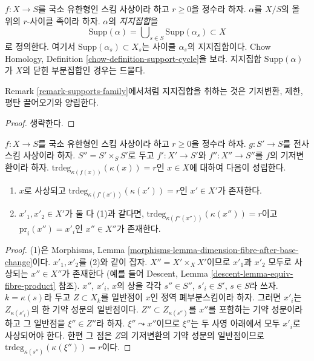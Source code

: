 \begin{remark}[지지집합]
\label{remark-supports-family}
$f : X \to S$를 국소 유한형인 스킴 사상이라 하고 $r \geq 0$을
정수라 하자. $\alpha$를 $X/S$의 올 위의 $r$-사이클 족이라 하자.
$\alpha$의 {\it 지지집합}을
$$
\text{Supp}(\alpha) =
\bigcup\nolimits_{s \in S} \text{Supp}(\alpha_s) \subset X
$$
로 정의한다. 여기서 $\text{Supp}(\alpha_s) \subset X_s$는
사이클 $\alpha_s$의 지지집합이다. Chow Homology, Definition
\ref{chow-definition-support-cycle}을 보라. 지지집합
$\text{Supp}(\alpha)$가 $X$의 닫힌 부분집합인 경우는 드물다.
\end{remark}

\begin{lemma}
\label{lemma-support-family}
Remark \ref{remark-supports-family}에서처럼 지지집합을 취하는 것은
기저변환, 제한, 평탄 끌어오기와 양립한다.
\end{lemma}

\begin{proof}
생략한다.
\end{proof}



\begin{lemma}
\label{lemma-coequalizer-dim-r}
$f : X \to S$를 국소 유한형인 스킴 사상이라 하고 $r \geq 0$을
정수라 하자. $g : S' \to S$를 전사 스킴 사상이라 하자.
$S'' = S' \times_S S'$로 두고 $f' : X' \to S'$와
$f'' : X'' \to S''$를 $f$의 기저변환이라 하자.
$\text{trdeg}_{\kappa(f(x))}(\kappa(x)) = r$인 $x \in X$에 대하여
다음이 성립한다.
\begin{enumerate}
\item $x$로 사상되고 $\text{trdeg}_{\kappa(f'(x'))}(\kappa(x')) = r$인
$x' \in X'$가 존재한다.
\item $x'_1, x'_2 \in X'$가 둘 다 (1)과 같다면,
$\text{trdeg}_{\kappa(f''(x''))}(\kappa(x'')) = r$이고
$\text{pr}_i(x'') = x'_i$인 $x'' \in X''$가 존재한다.
\end{enumerate}
\end{lemma}

\begin{proof}
(1)은 Morphisms, Lemma
\ref{morphisms-lemma-dimension-fibre-after-base-change}이다.
$x'_1, x'_2$를 (2)와 같이 잡자. $X'' = X' \times_X X'$이므로
$x'_1$과 $x'_2$ 모두로 사상되는 $x'' \in X''$가 존재한다
(예를 들어 Descent, Lemma \ref{descent-lemma-equiv-fibre-product} 참조).
$x''$, $x'_i$, $x$의 상을 각각 $s'' \in S''$, $s'_i \in S'$,
$s \in S$라 쓰자. $k = \kappa(s)$라 두고 $Z \subset X_k$를
일반점이 $x$인 정역 폐부분스킴이라 하자. 그러면 $x'_i$는
$Z_{\kappa(s'_i)}$의 한 기약 성분의 일반점이다.
$Z'' \subset Z_{\kappa(s'')}$를 $x''$를 포함하는 기약 성분이라 하고
그 일반점을 $\xi'' \in Z''$라 하자. $\xi'' \leadsto x''$이므로
$\xi''$는 두 사영 아래에서 모두 $x'_i$로 사상되어야 한다. 한편
그 점은 $Z$의 기저변환의 기약 성분의 일반점이므로
$\text{trdeg}_{\kappa(s'')}(\kappa(\xi'')) = r$이다.
\end{proof}

